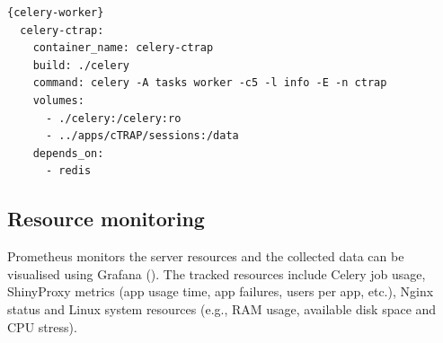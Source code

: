 \begin{lstlisting}[caption=Configuration of the Celery service for cTRAP in \texttt{docker-compose.yml}.,language=XML,label={lst:celery-worker}]{celery-worker}
  celery-ctrap:
    container_name: celery-ctrap
    build: ./celery
    command: celery -A tasks worker -c5 -l info -E -n ctrap
    volumes:
      - ./celery:/celery:ro
      - ../apps/cTRAP/sessions:/data
    depends_on:
      - redis
\end{lstlisting}

\subsection{Resource monitoring}

Prometheus monitors the server resources and the collected data can be visualised using Grafana (). The tracked resources include Celery job usage, ShinyProxy metrics (app usage time, app failures, users per app, etc.), Nginx status and Linux system resources (e.g., RAM usage, available disk space and CPU stress).


